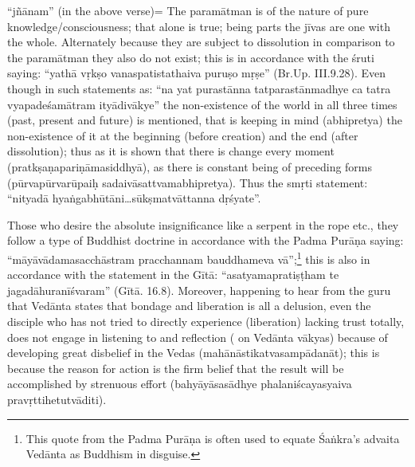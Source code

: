 “jñānam” (in the above verse)= The paramātman is of the nature of pure knowledge/consciousness; that alone is true; being parts the jīvas are one with the whole. Alternately because they are subject to dissolution in comparison to the paramātman they also do not exist; this is in accordance with the śruti saying: “yathā vṛkṣo vanaspatistathaiva puruṣo mṛṣe” (Br.Up. III.9.28). Even though in such statements as: ``na yat purastānna tatparastānmadhye ca tatra vyapadeśamātram ityādivākye'' the non-existence of the world in all three times (past, present and future) is mentioned, that is keeping in mind (abhipretya) the non-existence of it at the beginning (before creation) and the end (after dissolution); thus as it is shown that there is change every moment (pratkṣaṇapariṇāmasiddhyā),  as there is constant being of  preceding forms (pūrvapūrvarūpaiḥ sadaivāsattvamabhipretya). Thus the smṛti statement: “nityadā hyaṅgabhūtāni…sūkṣmatvāttanna dṛśyate”.

Those who desire the absolute insignificance like a serpent in the rope etc., they follow a type of Buddhist doctrine in accordance with the Padma Purāṇa saying: “māyāvādamasacchāstram pracchannam bauddhameva vā”;\footnote{This quote from the Padma Purāṇa is often used to equate Śaṅkra’s advaita Vedānta as Buddhism in disguise.} this is also in accordance with the statement in the Gītā: “asatyamapratiṣṭham te jagadāhuranīśvaram” (Gītā. 16.8). Moreover, happening to hear from the guru that Vedānta states that bondage and liberation is all a delusion, even the disciple who has not tried to directly experience (liberation) lacking trust totally, does not  engage in listening to and reflection ( on Vedānta vākyas) because of developing great disbelief in the Vedas (mahānāstikatvasampādanāt); this is because the reason for action is the firm belief that the result will be accomplished by strenuous effort (bahyāyāsasādhye phalaniścayasyaiva pravṛttihetutvāditi).

